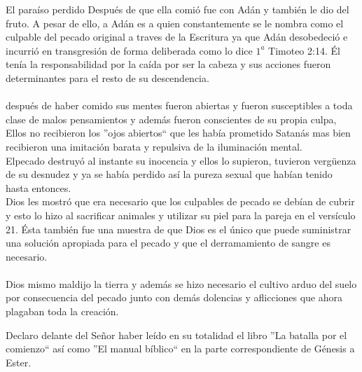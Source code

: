 \begin{section}{El paraíso perdido}
Después de que ella comió fue con Adán y también le dio del fruto. A pesar de ello, a Adán es a quien constantemente se le nombra como el culpable del pecado original a traves de la Escritura ya que Adán desobedeció e incurrió en transgresión de forma deliberada como lo dice $1^{a}$ Timoteo 2:14. Él tenía la responsabilidad por la caída por ser la cabeza y sus acciones fueron determinantes para el resto de su descendencia.\\
\\
después de haber comido sus mentes fueron abiertas y fueron susceptibles a toda clase de malos pensamientos y además fueron conscientes de su propia culpa, Ellos no recibieron los ''ojos abiertos`` que les había prometido Satanás mas bien recibieron una imitación barata y repulsiva de la iluminación mental.\\
Elpecado destruyó al instante su inocencia y ellos lo supieron, tuvieron vergüenza de su desnudez y ya se había perdido así la pureza sexual que habían tenido hasta entonces.\\
Dios les mostró que era necesario que los culpables de pecado se debían de cubrir y esto lo hizo al sacrificar animales y utilizar su piel para la pareja en el versículo 21. Ésta también fue una muestra de que Dios es el único que puede suministrar una solución apropiada para el pecado y que el derramamiento de sangre es necesario.\\
\\ Dios mismo maldijo la tierra y además se hizo necesario el cultivo arduo del suelo por consecuencia del pecado junto con demás dolencias y aflicciones que ahora plagaban toda la creación.
\end{section}
\newpage
Declaro delante del Señor haber leído en su totalidad el libro ''La batalla por el comienzo`` así como ''El manual bíblico`` en la parte correspondiente de Génesis a Ester.
%
